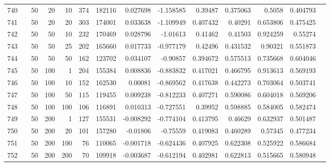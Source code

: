 \begin{longtable}{llrrrrrrrrrrrr}
		740 & &           50 &                20 &           10 &         374 &     182116 &  0.027698 & -1.158585 &   0.39487 &    0.375063 &         0.5058 &  0.404793 \\
		741 & &           50 &                20 &           20 &         303 &     174001 &  0.033638 & -1.109949 &  0.407432 &     0.40291 &       0.653806 &  0.475425 \\
		742 & &           50 &                50 &           10 &         232 &     170469 &  0.028796 &  -1.01613 &   0.41462 &     0.41503 &       0.924259 &   0.55274 \\
		743 & \multirow[b]{10}{*}{\rotatebox[origin=l]{90}{use-tf-idf-weighted}} &           50 &                50 &           25 &         202 &     165660 &  0.017733 & -0.977179 &   0.42496 &    0.431532 &        0.90321 &  0.551873 \\
		744 & &           50 &                50 &           50 &         162 &     123702 &  0.034107 &  -0.90857 &  0.394672 &    0.575513 &       0.735668 &  0.604046 \\
		745 & &           50 &               100 &            1 &         204 &     155384 &  0.008836 & -0.883832 &  0.417021 &    0.466795 &       0.913613 &  0.569193 \\
		746 & &           50 &               100 &           10 &         152 &     162530 &   0.00081 & -0.869562 &  0.417638 &    0.442273 &       0.703064 &  0.503741 \\
		747 & &           50 &               100 &           50 &         115 &     119455 &  0.009238 & -0.812233 &  0.407271 &    0.590086 &       0.604018 &  0.569206 \\
		748 & &           50 &               100 &          100 &         106 &     116891 &  0.010313 & -0.727551 &   0.39952 &    0.598885 &       0.584005 &  0.582474 \\
		749 & &           50 &               200 &            1 &         127 &     155531 & -0.008292 & -0.774104 &  0.413795 &     0.46629 &       0.632937 &  0.501487 \\
		750 & &           50 &               200 &           20 &         101 &     157280 &  -0.01806 &  -0.75559 &  0.419083 &    0.460289 &        0.57345 &  0.477234 \\
		751 & &           50 &               200 &          100 &          76 &     110065 & -0.001718 & -0.624436 &  0.407925 &    0.622308 &       0.525922 &  0.586684 \\
		752 & &           50 &               200 &          200 &          70 &     109918 & -0.003687 & -0.612194 &  0.402981 &    0.622813 &       0.515665 &  0.580948 \\
	\end{longtable}
\normalsize